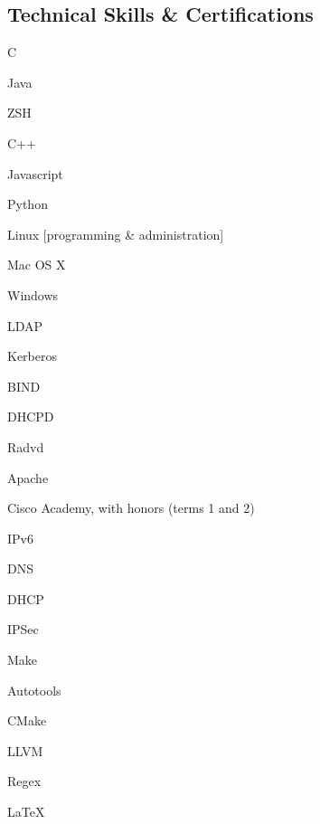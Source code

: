 \documentclass[a4paper,margin,line]{resume}
\begin{document}
\begin{resume}
\section{\mysidestyle Technical Skills \& Certifications}
	\begin{compactdesc}
		\item[Fluent Languages] \begin{inparaenum} { \small
			\item C
			\item Java
			\item ZSH
			\item C++
			\item Javascript
			\item Python
		} \end{inparaenum}
		\item[Operating Systems] \begin{inparaenum} { \small
			\item Linux [programming \& administration]
			\item Mac OS X
			\item Windows
		} \end{inparaenum}
		\item[Server Administration] \begin{inparaenum} { \small
			\item LDAP
			\item Kerberos
			\item BIND
			\item DHCPD
			\item Radvd
			\item Apache
		} \end{inparaenum}
		\item[Networking] \begin{inparaenum} { \small
			\item Cisco Academy, with honors (terms 1 and 2)
			\item IPv6
			\item DNS
			\item DHCP
			\item IPSec
		} \end{inparaenum}
		\item[Tools] \begin{inparaenum} { \small
			\item Make
			\item Autotools
			\item CMake
			\item LLVM
			\item Regex
			\item \LaTeX
		} \end{inparaenum}

\end{compactdesc}
\end{resume}
\end{document}
